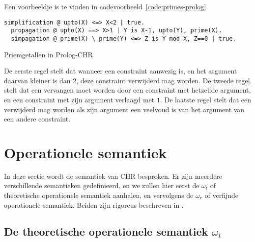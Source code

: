 Een voorbeeldje is te vinden in codevoorbeeld~\ref{code:primes-prolog}
\begin{exCode}[bp]
\begin{Verbatim}[frame=single]
  simplification @ upto(X) <=> X<2 | true.
  propagation @ upto(X) ==> X>1 | Y is X-1, upto(Y), prime(X).
  simpagation @ prime(X) \ prime(Y) <=> Z is Y mod X, Z==0 | true.
\end{Verbatim}
\caption{Priemgetallen in Prolog-CHR}
\label{code:primes-prolog}
\end{exCode}
De eerste regel stelt dat wanneer een  constraint aanwezig is, en het argument daarvan kleiner is dan $2$, deze constraint verwijderd mag worden. De tweede regel stelt dat een  vervangen moet worden door een  constraint met hetzelfde argument, en een  constraint met zijn argument verlaagd met $1$. De laatste regel stelt dat een  verwijderd mag worden als zijn argument een veelvoud is van het argument van een andere  constraint.

\section{Operationele semantiek}

In deze sectie wordt de semantiek van CHR besproken. Er zijn meerdere verschillende semantieken gedefinieerd, en we zullen hier eerst de $\omega_t$ of theoretische operationele semantiek aanhalen, en vervolgens de $\omega_r$ of verfijnde operationele semantiek. Beiden zijn rigoreus beschreven in \cite{refined}.

\subsection{De theoretische operationele semantiek $\omega_t$}

